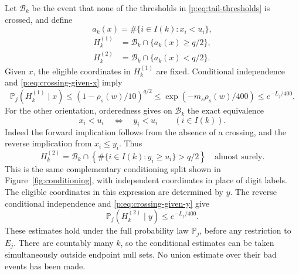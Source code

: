 Let $\mathcal B_k$ be the event that none of the thresholds in
\eqref{p:eq:tail-thresholds} is crossed, and define
\[
 a_k(x)=\#\{i\in I(k):x_i<u_i\},
\]
\[
 \begin{aligned}
 H_k^{(1)}&=\mathcal B_k\cap\{a_k(x)\ge q/2\},\\
 H_k^{(2)}&=\mathcal B_k\cap\{a_k(x)<q/2\}.
 \end{aligned}
\]
Given $x$, the eligible coordinates in $H_k^{(1)}$ are fixed.
Conditional independence and \eqref{p:eq:crossing-given-x} imply
\begin{equation}\label{p:eq:first-bad-probability}
 \mathbb P_j(H_k^{(1)}\mid x)
 \le(1-\rho_s(w)/10)^{q/2}
 \le\exp(-m_s\rho_s(w)/400)
 \le e^{-L_j/400}.
\end{equation}
For the other orientation, orderedness gives on $\mathcal B_k$ the
exact equivalence
\[
 x_i<u_i\quad\Longleftrightarrow\quad y_i<u_i
 \qquad(i\in I(k)).
\]
Indeed the forward implication follows from the absence of a
crossing, and the reverse implication from $x_i\le y_i$.  Thus
\begin{equation}\label{p:eq:second-bad-event}
 H_k^{(2)}
 =\mathcal B_k\cap
   \left\{\#\{i\in I(k):y_i\ge u_i\}>q/2\right\}
 \quad\text{almost surely}.
\end{equation}
This is the same complementary conditioning split shown in
Figure~\ref{fig:conditioning}, with independent coordinates in place
of digit labels.
The eligible coordinates in this expression are determined by $y$.
The reverse conditional independence and
\eqref{p:eq:crossing-given-y} give
\begin{equation}\label{p:eq:second-bad-probability}
 \mathbb P_j(H_k^{(2)}\mid y)\le e^{-L_j/400}.
\end{equation}
These estimates hold under the full probability law $\mathbb P_j$,
before any restriction to $E_j$.  There are countably many $k$, so
the conditional estimates can be taken simultaneously outside
endpoint null sets.  No union estimate over their bad events has
been made.


